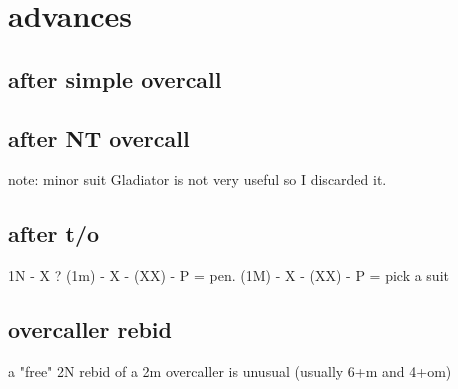 \section{advances}

\subsection{after simple overcall}


\subsection{after NT overcall}


note: minor suit Gladiator is not very useful so I discarded it.

\subsection{after t/o}


1N - X ?
(1m) - X - (XX) - P = pen.
(1M) - X - (XX) - P = pick a suit

\subsection{overcaller rebid}

a "free" 2N rebid of a 2m overcaller is unusual (usually 6+m and 4+om)